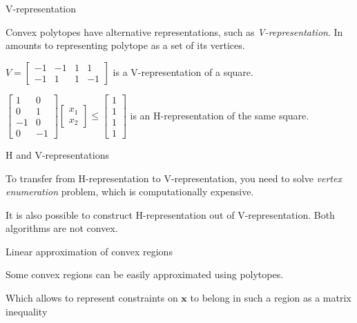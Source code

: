 \documentclass{beamer}
\begin{document}
\begin{frame}{V-representation}
\begin{flushleft}

Convex polytopes have alternative representations, such as \emph{V-representation}. In amounts to representing polytope as a set of its vertices.

\begin{example}
$V = \begin{bmatrix} -1 & -1 & 1 & 1 \\ -1 & 1 & 1 & -1 \end{bmatrix}$ is a V-representation of a square.
\end{example}

\begin{example}
$\begin{bmatrix} 1 & 0 \\ 0 & 1 \\ -1 & 0 \\ 0 & -1 \end{bmatrix}
\begin{bmatrix} x_1 \\ x_2 \end{bmatrix} \leq
\begin{bmatrix} 1 \\ 1 \\ 1 \\ 1 \end{bmatrix}$
is an H-representation of the same square.
\end{example}
 
\end{flushleft}
\end{frame}



\begin{frame}{H and V-representations}
\begin{flushleft}

To transfer from H-representation to V-representation, you need to solve \emph{vertex enumeration} problem, which is computationally expensive. 

\bigskip

It is also possible to construct H-representation out of V-representation.  Both algorithms are not convex.
 
\end{flushleft}
\end{frame}




\begin{frame}{Linear approximation of convex regions}
\begin{flushleft}
Some convex regions can be easily approximated using polytopes.



Which allows to represent constraints on $\mathbf{x}$ to belong in such a region as a matrix inequality
 
\end{flushleft}
\end{frame}
\end{document}
